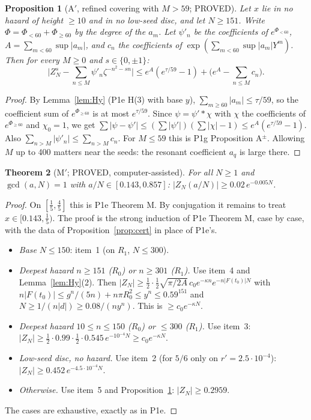 \documentclass[11pt]{article}
\newtheorem{theorem}{Theorem}\newtheorem{lemma}[theorem]{Lemma}\newtheorem{proposition}[theorem]{Proposition}
\theoremstyle{remark}\newtheorem{remark}[theorem]{Remark}
\begin{document}
\begin{proposition}[A$'$, refined covering with $M>59$; PROVED]\label{prop:A}
Let $x$ lie in no hazard of height $\ge10$ and in no low-seed disc, and let $N\ge151$. Write $\Phi=\Phi_{<60}+\Phi_{\ge60}$ by the degree of the $a_m$. Let $\psi'_n$ be the coefficients of $e^{\Phi_{<60}}$, $A=\sum_{m<60}\sup|a_m|$, and $c_n$ the coefficients of $\exp(\sum_{m<60}\sup|a_m|Y^m)$. Then for every $M\ge0$ and $s\in\{0,\pm1\}$:
\[\Big|Z^s_N-\sum_{n\le M}\psi'_n\zeta^{-n^2-sn}\Big|\le e^{A}(e^{\tau/59}-1)+\Big(e^{A}-\sum_{n\le M}c_n\Big).\]
\end{proposition}
\begin{proof}
By Lemma~\ref{lem:Hy} (P1e H(3) with base $y$), $\sum_{m\ge60}|a_m|\le\tau/59$, so the coefficient sum of $e^{\Phi_{\ge60}}$ is at most $e^{\tau/59}$.
Since $\psi=\psi'*\chi$ with $\chi$ the coefficients of $e^{\Phi_{\ge60}}$ and $\chi_0=1$, we get $\sum|\psi-\psi'|\le(\sum|\psi'|)(\sum|\chi|-1)\le e^A(e^{\tau/59}-1)$. Also $\sum_{n>M}|\psi'_n|\le\sum_{n>M}c_n$.
For $M\le59$ this is P1g Proposition A$^\pm$. Allowing $M$ up to 400 matters near the seeds: the resonant coefficient $a_q$ is large there.
\end{proof}

\begin{theorem}[M$'$; PROVED, computer-assisted]\label{thm:M}
For all $N\ge1$ and $\gcd(a,N)=1$ with $a/N\in[0.143,0.857]$: $|Z_N(a/N)|\ge0.02\,e^{-0.005N}$.
\end{theorem}
\begin{proof}
On $[\frac15,\frac45]$ this is P1e Theorem M. By conjugation it remains to treat $x\in[0.143,\frac15)$. The proof is the strong induction of P1e Theorem M, case by case, with the data of Proposition~\ref{prop:cert} in place of P1e's.
\begin{itemize}
\item \emph{Base} $N\le150$: item~1 (on $R_1$, $N\le300$).
\item \emph{Deepest hazard $n\ge151$ ($R_0$) or $n\ge301$ ($R_1$).} Use item~4 and Lemma~\ref{lem:Hy}(2). Then $|Z_N|\ge\frac12\cdot\frac12\sqrt{\pi/2A}\,c_0e^{-\kappa n}e^{-n|F(t_0)|N}$ with $n|F(t_0)|\le g^n/(5n)+n\pi R_0^2\le y^n\le0.59^{151}$ and $N\ge1/(n|d|)\ge0.08/(ny^n)$. This is $\ge c_0e^{-\kappa N}$.
\item \emph{Deepest hazard $10\le n\le150$ ($R_0$) or $\le300$ ($R_1$).} Use item~3: $|Z_N|\ge\frac12\cdot0.99\cdot\frac12\cdot0.545\,e^{-10^{-4}N}\ge c_0e^{-\kappa N}$.
\item \emph{Low-seed disc, no hazard.} Use item~2 (for $5/6$ only on $r'=2.5\cdot10^{-4}$): $|Z_N|\ge0.452\,e^{-4.5\cdot10^{-4}N}$.
\item \emph{Otherwise.} Use item~5 and Proposition~\ref{prop:A}: $|Z_N|\ge0.2959$.
\end{itemize}
The cases are exhaustive, exactly as in P1e.
\end{proof}
\end{document}
